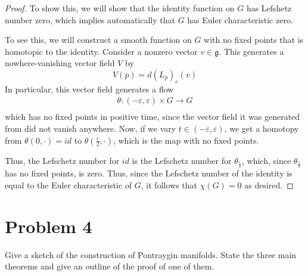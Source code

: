\documentclass[fontsize=11pt]{scrartcl} %
\numberwithin{equation}{section} %
\numberwithin{figure}{section} %
\numberwithin{table}{section} %
\begin{document}
\begin{proof}
    To show this, we will show that the identity function on $G$ has Lefshetz
    number zero, which implies automatically that $G$ has Euler characteristic
    zero.

    To see this, we will construct a smooth function on $G$ with no fixed
    points that is homotopic to the identity. Consider a nonzero vector $v\in
    \mathfrak{g}$. This generates a nowhere-vanishing vector field $V$ by
    \[
        V(p) = d(L_p)_e(v)
    \]
    In particular, this vector field generates a flow
    \[
\begin{aligned}
    \theta:(-\varepsilon,\varepsilon)\times G\to G\\
\end{aligned}
    \]
    which has no fixed points in positive time, since the vector field it was
    generated from did not vanish anywhere. Now, if we vary
    $t\in(-\varepsilon,\varepsilon)$, we get a homotopy from $\theta(0,\cdot) =
    id$ to $\theta(\frac{\varepsilon}{2},\cdot)$, which is the map with no fixed
    points.

    Thus, the Lefschetz number for $id$ is the Lefschetz number for
    $\theta_{\frac{\varepsilon}{2}}$, which, since
    $\theta_{\frac{\varepsilon}{2}}$ has no fixed points, is zero. Thus, since
    the Lefschetz number of the identity is equal to the Euler characteristic of
    $G$, it follows that $\chi(G)=0$ as desired.
\end{proof}

\newpage

\section*{Problem 4}
Give a sketch of the construction of Pontraygin manifolds. State the three main
theorems and give an outline of the proof of one of them.
\end{document}
